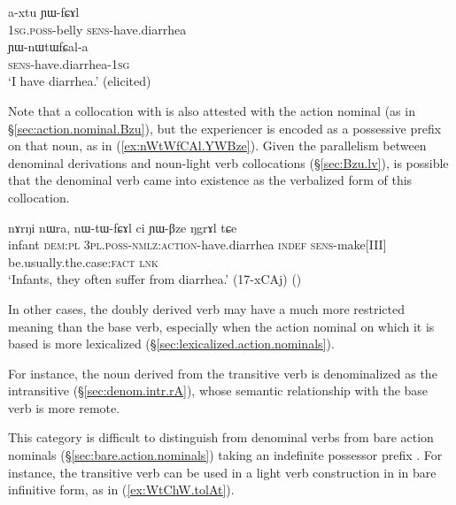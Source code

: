 \begin{exe}
\ex \label{ex:axtu.YWfCAl}
\gll a-xtu ɲɯ-fɕɤl \\
\textsc{1sg}.\textsc{poss}-belly \textsc{sens}-have.diarrhea \\
\ex \label{ex:YWnWtWfCala}
\gll ɲɯ-nɯtɯfɕal-a \\
\textsc{sens}-have.diarrhea-\textsc{1sg} \\
\glt `I have diarrhea.' (elicited)
\end{exe}

Note that a collocation with  is also attested with the action nominal  (as in §\ref{sec:action.nominal.Bzu}), but the experiencer is encoded as a possessive prefix on that noun, as  in (\ref{ex:nWtWfCAl.YWBze}). Given the parallelism between denominal derivations and noun-light verb collocations (§\ref{sec:Bzu.lv}), is possible that the denominal verb  came into existence as the verbalized form of this collocation.

\begin{exe}
\ex \label{ex:nWtWfCAl.YWBze}
\gll nɤrŋi nɯra, nɯ-tɯ-fɕɤl ci ɲɯ-βze ŋgrɤl tɕe \\
infant \textsc{dem}:\textsc{pl} \textsc{3pl}.\textsc{poss}-\textsc{nmlz}:\textsc{action}-have.diarrhea \textsc{indef} \textsc{sens}-make[III] be.usually.the.case:\textsc{fact} \textsc{lnk} \\
\glt `Infants, they often suffer from diarrhea.' (17-xCAj) 	()
\end{exe}

In other cases, the doubly derived verb may have a much more restricted meaning than the base verb, especially when the action nominal on which it is based is more lexicalized (§\ref{sec:lexicalized.action.nominals}). 

For instance, the noun  derived from the transitive verb  is denominalized as the intransitive  (§\ref{sec:denom.intr.rA}), whose semantic relationship with the base verb is more remote.

This category is difficult to distinguish from denominal verbs from bare action nominals (§\ref{sec:bare.action.nominals}) taking an indefinite possessor prefix . For instance, the transitive verb  can be used in a light verb construction in  in bare infinitive form, as in (\ref{ex:WtChW.tolAt}).

